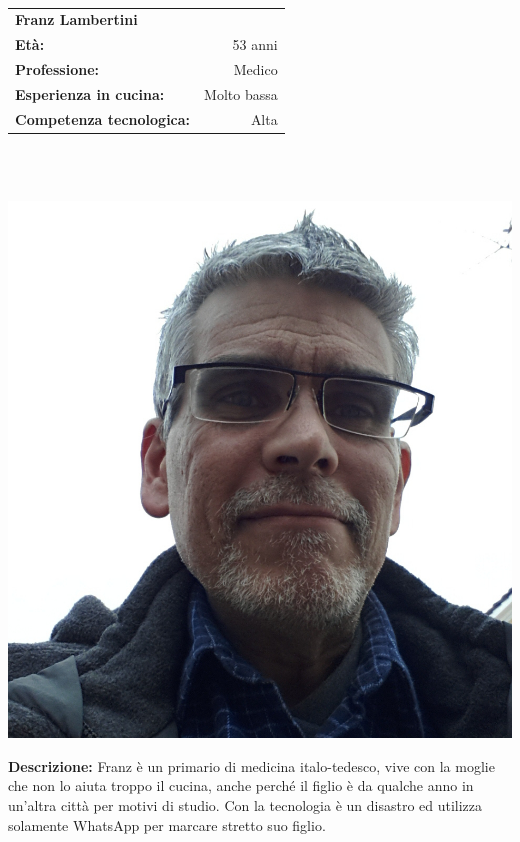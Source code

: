 \hrulefill\\
\begin{minipage}{.75\textwidth}
\begin{tabular}{l | r}
\textbf{Franz Lambertini} & \\
\textbf{Età:} & 53 anni\\
\textbf{Professione:} & Medico\\
\textbf{Esperienza in cucina:} & Molto bassa\\
\textbf{Competenza tecnologica:} & Alta\\
\end{tabular}\\\\
\end{minipage}
\begin{minipage}{.24\textwidth}
	\includegraphics[width=\textwidth]{img/personas/franz}
\end{minipage}
	\textbf{Descrizione:}
	Franz è un primario di medicina italo-tedesco, vive con la moglie che
	non lo aiuta troppo il cucina, anche perché il figlio è da qualche anno
	in un'altra città per motivi di studio. Con la
	tecnologia è un disastro ed utilizza solamente WhatsApp per marcare
	stretto suo figlio.

